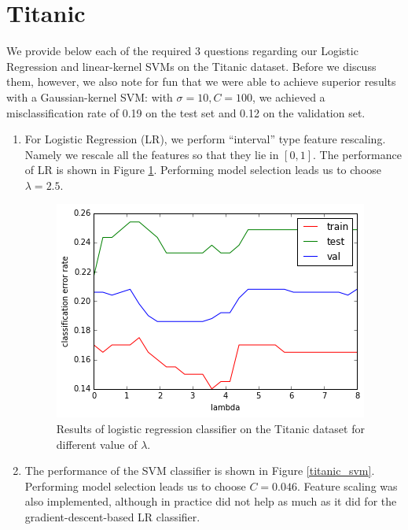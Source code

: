 \documentclass[10pt]{article}
\begin{document}
\section{Titanic}

We provide below each of the required 3 questions regarding our Logistic Regression and linear-kernel SVMs on the Titanic dataset.  Before we discuss them, however, we also note for fun that we were able to achieve superior results with a Gaussian-kernel SVM: with $\sigma=10, C=100$, we achieved a misclassification rate of 0.19 on the test set and 0.12 on the validation set.

\begin{enumerate}
\item For Logistic Regression (LR), we perform ``interval'' type feature rescaling. Namely we rescale all the features so that they lie in $[0,1]$. The performance of LR is shown in Figure \ref{titanic_logit}. Performing model selection leads us to choose $\lambda = 2.5$.
 \begin{figure}
 \centering
 \includegraphics[scale=0.5]{titanic_logit.png}
 \caption{Results of logistic regression classifier on the Titanic dataset for different value of $\lambda$.}
  \label{titanic_logit}
 \end{figure}
 


 \item The performance of the SVM classifier is shown in Figure \ref{titanic_svm}.  Performing model selection leads us to choose $C=0.046$.  Feature scaling was also implemented, although in practice did not help as much as it did for the gradient-descent-based LR classifier.
 

\end{enumerate}
\end{document}
